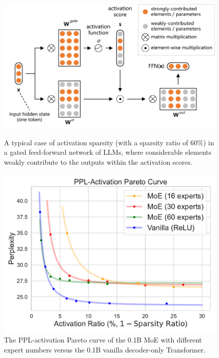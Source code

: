 \documentclass{article} %
\begin{document}
\begin{figure}[ht]
\begin{minipage}[c]{0.55\linewidth}
    \centering
    \includegraphics[width=\linewidth]{figures/activation_sparsity.pdf}
    \caption{A typical case of activation sparsity (with a sparsity ratio of 60\%) in a gated feed-forward network of LLMs, where considerable elements weakly contribute to the outputs within the activation scores.}
    \label{fig:activation-sparsity}
\end{minipage}
\hfill
\begin{minipage}[c]{0.42\linewidth}
    \centering
    \includegraphics[width=\linewidth]{figures/moe_bottleneck_01b.pdf}
    \caption{The PPL-activation Pareto curve of the 0.1B MoE with different expert numbers versus the 0.1B vanilla decoder-only Transformer.}
    \label{fig:pareto-moe}
\end{minipage}
\vspace{-1.5em}
\end{figure}
\end{document}
